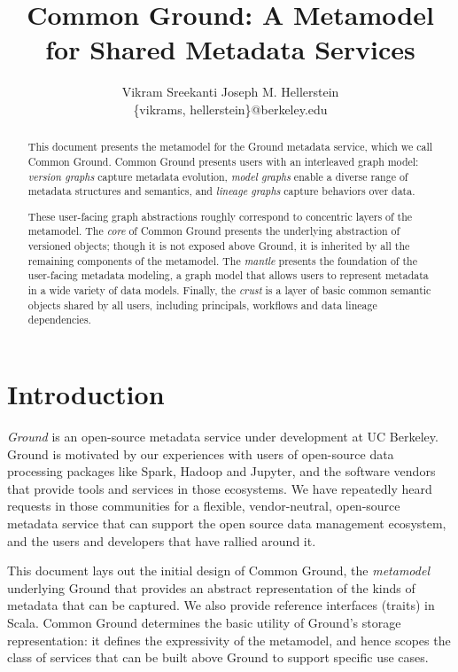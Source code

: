 \documentclass{article}
\author{
Vikram Sreekanti \hspace{2in}
Joseph M. Hellerstein\\
       {\scriptsize \{vikrams, hellerstein\}@berkeley.edu}
}
\title{Common Ground: A Metamodel for Shared Metadata Services}
\date{}
\newcommand{\core}{core\xspace}
\newcommand{\mantle}{mantle\xspace}
\newcommand{\crust}{crust\xspace}
\newcommand{\versiongraphs}{version graphs\xspace}
\newcommand{\modelgraphs}{model graphs\xspace}
\newcommand{\lineagegraphs}{lineage graphs\xspace}
\begin{document}
\maketitle

\begin{abstract}
This document presents the metamodel for the Ground metadata service, which we call Common Ground.  Common Ground presents users with an interleaved graph model: \emph{\versiongraphs} capture metadata evolution, \emph{\modelgraphs} enable a diverse range of metadata structures and semantics, and \emph{\lineagegraphs} capture behaviors over data. 

These user-facing graph abstractions roughly correspond to concentric layers of the metamodel. The \emph{\core} of Common Ground presents the underlying abstraction of versioned objects; though it is not exposed above Ground, it is inherited by all the remaining components of the metamodel.  The \emph{\mantle} presents the foundation of the user-facing metadata modeling, a graph model that allows users to represent metadata in a wide variety of data models.  Finally, the \emph{\crust} is a layer of basic common semantic objects shared by all users, including principals, workflows and data lineage dependencies.
\end{abstract}




\section{Introduction}
\emph{Ground} is an open-source metadata service under development at UC Berkeley.  Ground is motivated by our experiences with users of open-source data processing packages like Spark, Hadoop and Jupyter, and the software vendors that provide tools and services in those ecosystems.  We have repeatedly heard requests in those communities for a flexible, vendor-neutral, open-source metadata service that can support the open source data management ecosystem, and the users and developers that have rallied around it.

This document lays out the initial design of Common Ground, the \emph{metamodel} underlying Ground that provides an abstract representation of the kinds of metadata that can be captured.  We also provide reference interfaces (traits) in Scala.
Common Ground determines the basic utility of Ground's storage representation: it defines the expressivity of the metamodel, and hence scopes the class of services that can be built above Ground to support specific use cases.
\end{document}
